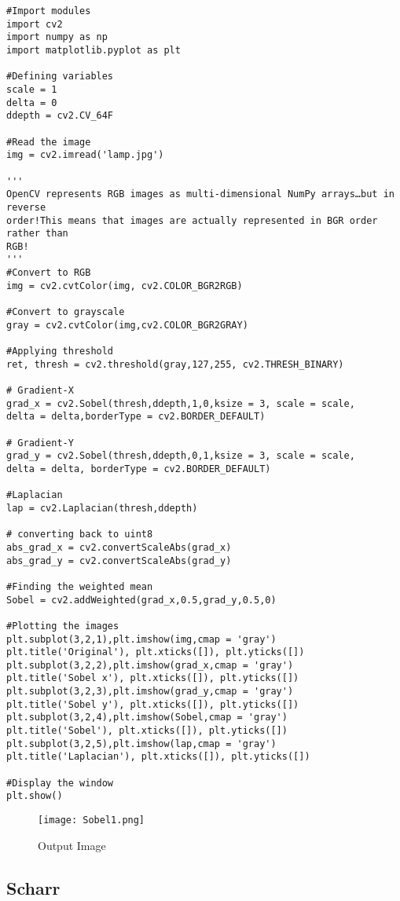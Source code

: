 \documentclass[]{article}
\begin{document}
\begin{verbatim}
#Import modules
import cv2
import numpy as np
import matplotlib.pyplot as plt

#Defining variables
scale = 1
delta = 0
ddepth = cv2.CV_64F

#Read the image
img = cv2.imread('lamp.jpg')

'''
OpenCV represents RGB images as multi-dimensional NumPy arrays…but in reverse
order!This means that images are actually represented in BGR order rather than
RGB!
'''
#Convert to RGB
img = cv2.cvtColor(img, cv2.COLOR_BGR2RGB)    

#Convert to grayscale
gray = cv2.cvtColor(img,cv2.COLOR_BGR2GRAY) 

#Applying threshold
ret, thresh = cv2.threshold(gray,127,255, cv2.THRESH_BINARY) 

# Gradient-X
grad_x = cv2.Sobel(thresh,ddepth,1,0,ksize = 3, scale = scale, 
delta = delta,borderType = cv2.BORDER_DEFAULT)

# Gradient-Y
grad_y = cv2.Sobel(thresh,ddepth,0,1,ksize = 3, scale = scale, 
delta = delta, borderType = cv2.BORDER_DEFAULT)

#Laplacian
lap = cv2.Laplacian(thresh,ddepth) 

# converting back to uint8
abs_grad_x = cv2.convertScaleAbs(grad_x)   
abs_grad_y = cv2.convertScaleAbs(grad_y)

#Finding the weighted mean
Sobel = cv2.addWeighted(grad_x,0.5,grad_y,0.5,0)

#Plotting the images
plt.subplot(3,2,1),plt.imshow(img,cmap = 'gray')
plt.title('Original'), plt.xticks([]), plt.yticks([])
plt.subplot(3,2,2),plt.imshow(grad_x,cmap = 'gray')
plt.title('Sobel x'), plt.xticks([]), plt.yticks([])
plt.subplot(3,2,3),plt.imshow(grad_y,cmap = 'gray')
plt.title('Sobel y'), plt.xticks([]), plt.yticks([])
plt.subplot(3,2,4),plt.imshow(Sobel,cmap = 'gray')
plt.title('Sobel'), plt.xticks([]), plt.yticks([])
plt.subplot(3,2,5),plt.imshow(lap,cmap = 'gray')
plt.title('Laplacian'), plt.xticks([]), plt.yticks([])

#Display the window
plt.show()
\end{verbatim}

\begin{figure}[htbp]
\centering
\texttt{[image: Sobel1.png]}
\caption{Output Image}
\end{figure}

\subsection{Scharr}\label{scharr-1}
\end{document}
